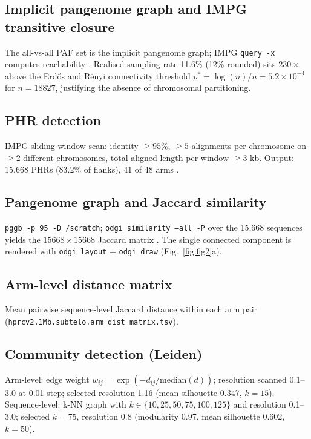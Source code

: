 \documentclass[pdflatex,mathphys]{jnl}
\begin{document}
\subsection*{Implicit pangenome graph and IMPG transitive closure}

The all-vs-all PAF set is the implicit pangenome graph; IMPG \texttt{query -x}
computes reachability
.
Realised sampling rate 11.6\% (12\% rounded) sits $230\times$ above the
Erd\H{o}s and R\'{e}nyi connectivity threshold
$p^{*} = \log(n)/n = 5.2 \times 10^{-4}$ for $n = 18827$, justifying the
absence of chromosomal partitioning.

\subsection*{PHR detection}

IMPG sliding-window scan: identity $\geq 95\%$, $\geq 5$ alignments per
chromosome on $\geq 2$ different chromosomes, total aligned length per window
$\geq 3$ kb.
Output: 15,668 PHRs (83.2\% of flanks), 41 of 48 arms .

\subsection*{Pangenome graph and Jaccard similarity}

\texttt{pggb -p 95 -D /scratch}; \texttt{odgi similarity --all -P} over the
15,668 sequences yields the $15668 \times 15668$ Jaccard matrix
.
The single connected component is rendered with \texttt{odgi layout} +
\texttt{odgi draw} (Fig.~\ref{fig:fig2}a).

\subsection*{Arm-level distance matrix}

Mean pairwise sequence-level Jaccard distance within each arm pair
(\texttt{hprcv2.1Mb.subtelo.arm\_dist\_matrix.tsv}).

\subsection*{Community detection (Leiden)}

Arm-level: edge weight $w_{ij} = \exp(-d_{ij} / \text{median}(d))$; resolution
scanned 0.1--3.0 at 0.01 step; selected resolution 1.16 (mean silhouette
0.347, $k = 15$).
Sequence-level: k-NN graph with $k \in \{10, 25, 50, 75, 100, 125\}$ and
resolution 0.1--3.0; selected $k = 75$, resolution 0.8 (modularity 0.97, mean
silhouette 0.602, $k = 50$).
\end{document}
